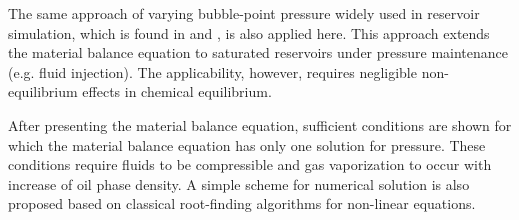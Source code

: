 \documentclass[authoryear,preprint,review,11pt]{elsarticle}
\begin{document}




 The same approach of varying bubble-point pressure widely used in reservoir simulation, which is found in \cite{aziz1979petroleum} and \cite{ertekin2001basic}, is also applied here. This approach extends the material balance equation to saturated reservoirs under pressure maintenance (e.g. fluid injection). The applicability, however, requires negligible non-equilibrium effects in chemical equilibrium.


After presenting the material balance equation, sufficient conditions are shown for which the material balance equation has only one solution for pressure. These conditions require fluids to be compressible and gas vaporization to occur with increase of oil phase density. A simple scheme for numerical solution is also proposed based on classical root-finding algorithms for non-linear equations.
\end{document}
